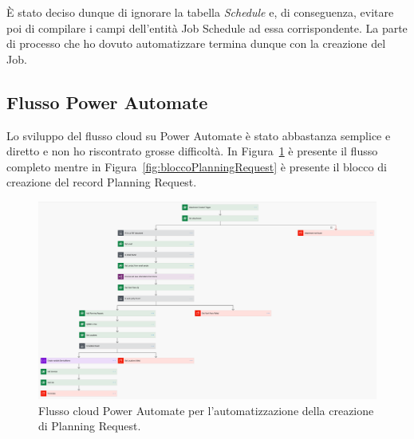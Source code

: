 È stato deciso dunque di ignorare la tabella \textit{Schedule} e, di conseguenza, evitare poi di compilare i campi dell'entità Job Schedule ad essa corrispondente. La parte di processo che ho dovuto automatizzare termina dunque con la creazione del Job.

\subsection{Flusso Power Automate}
Lo sviluppo del flusso cloud su Power Automate è stato abbastanza semplice e diretto e non ho riscontrato grosse difficoltà. In Figura~\ref{fig:flussoTfl} è presente il flusso completo mentre in Figura~\ref{fig:bloccoPlanningRequest} è presente il blocco di creazione del record Planning Request.

\begin{figure}[ht]
  \centering
  \includegraphics[width=\textwidth]{flusso-cloud-tfl.png}
  \caption{Flusso cloud Power Automate per l'automatizzazione della creazione di Planning Request.}
  \label{fig:flussoTfl}
\end{figure}

